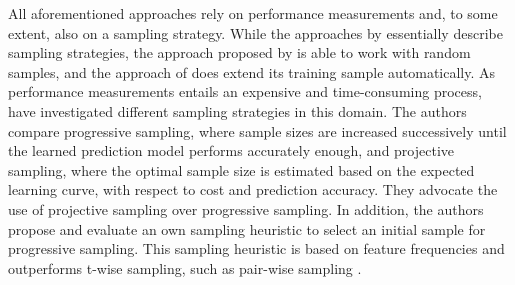 All aforementioned approaches rely on performance measurements and, to
some extent, also on a  sampling strategy. While the approaches by
\cite{siegmund_predicting_2012,siegmund_performance-influence_2015} essentially describe sampling strategies,
the approach proposed by \cite{zhang_performance_2015} is able to work with random samples, and the
approach of \cite{guo_variability-aware_2013} does extend its training sample automatically. As
performance measurements entails an expensive and time-consuming process,
\cite{sarkar_cost-efficient_2015} have investigated different sampling
strategies in this domain.
The authors compare progressive sampling, where sample sizes are increased
successively until the learned prediction model performs accurately enough, and projective
sampling, where the optimal sample size is estimated based on the expected
learning curve, with respect to cost and prediction accuracy. They advocate the
use of projective sampling over progressive sampling. In addition, the authors
propose and evaluate an own sampling heuristic to select an initial sample for
progressive sampling. This sampling heuristic is based on feature frequencies
and outperforms t-wise sampling, such as pair-wise sampling
\citep{sarkar_cost-efficient_2015}.